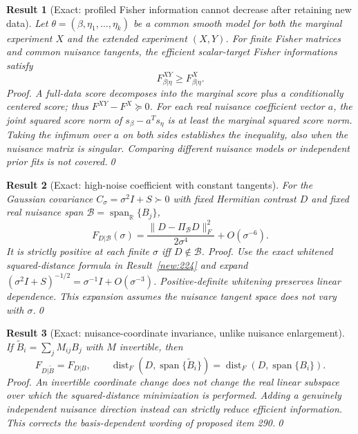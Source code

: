 \documentclass[aps,prd,onecolumn,notitlepage,groupedaddress,11pt]{revtex4-2}
\newtheorem{result}{Result}
\begin{document}
\begin{result}[\textsf{Exact}: profiled Fisher information cannot decrease after retaining new data]\label{new:235}
Let $\theta=(\beta,\eta_1,\ldots,\eta_k)$ be a common smooth model for both the marginal experiment $X$ and the extended experiment $(X,Y)$. For finite Fisher matrices and common nuisance tangents, the efficient scalar-target Fisher informations satisfy
\begin{equation}\label{eq:244-235}
F^{XY}_{\beta|\eta}\ge F^{X}_{\beta|\eta}.
\end{equation}
\textit{Proof.} A full-data score decomposes into the marginal score plus a conditionally centered score; thus $F^{XY}-F^X\succeq0$. For each real nuisance coefficient vector $a$, the joint squared score norm of $s_\beta-a^Ts_\eta$ is at least the marginal squared score norm. Taking the infimum over $a$ on both sides establishes the inequality, also when the nuisance matrix is singular. Comparing different nuisance models or independent prior fits is not covered.\qed
\end{result}

\begin{result}[\textsf{Exact}: high-noise coefficient with constant tangents]\label{new:236}
For the Gaussian covariance $C_\sigma=\sigma^2I+S\succ0$ with fixed Hermitian contrast $D$ and fixed real nuisance span $\mathcal B=\operatorname{span}_{\mathbb R}\{B_j\}$,
\begin{equation}\label{eq:244-236}
F_{D|\mathcal B}(\sigma)=\frac{\|D-\Pi_{\mathcal B}D\|_F^2}{2\sigma^4}+O(\sigma^{-6}).
\end{equation}
It is strictly positive at each finite $\sigma$ iff $D\notin\mathcal B$. \textit{Proof.} Use the exact whitened squared-distance formula in Result~\ref{new:224} and expand $(\sigma^2I+S)^{-1/2}=\sigma^{-1}I+O(\sigma^{-3})$. Positive-definite whitening preserves linear dependence. This expansion assumes the nuisance tangent space does not vary with $\sigma$.\qed
\end{result}

\begin{result}[\textsf{Exact}: nuisance-coordinate invariance, unlike nuisance enlargement]\label{new:237}
If $\widetilde B_i=\sum_j M_{ij}B_j$ with $M$ invertible, then
\begin{equation}\label{eq:244-237}
F_{D|\widetilde B}=F_{D|B},\qquad
\operatorname{dist}_F(D,\operatorname{span}\{\widetilde B_i\})=\operatorname{dist}_F(D,\operatorname{span}\{B_i\}).
\end{equation}
\textit{Proof.} An invertible coordinate change does not change the real linear subspace over which the squared-distance minimization is performed. Adding a genuinely independent nuisance direction instead can strictly reduce efficient information. This corrects the basis-dependent wording of proposed item 290.\qed
\end{result}
\end{document}
